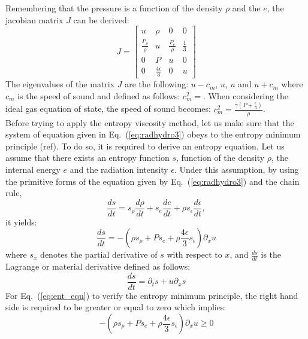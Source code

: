 \documentclass{article}
\newcommand{\eqt}[1]{Eq.~(\ref{#1})}                     %
\begin{document}
Remembering that the pressure is a function of the density $\rho$ and the $e$, the jacobian matrix $J$ can be derived:
\begin{equation}
J = \left[
\begin{array}{llll}
u & \rho & 0 & 0 \\
\frac{P_{\rho}}{\rho} & u & \frac{P_{e}}{\rho} & \frac{1}{3} \\
0 & P & u & 0 \\
0 & \frac{4 \epsilon}{3} & 0 & u  
\end{array}
\right]
\end{equation}
The eigenvalues of the matrix $J$ are the following: $u-c_m$, $u$, $u$ and $u+c_m$ where $c_m$ is the speed of sound and defined as follows: $c_m^2 = $. When considering the ideal gas equation of state, the speed of sound becomes: $c_m^2 = \frac{\gamma \left( P + \frac{\epsilon}{3} \right)}{\rho}$. \\
Before trying to apply the entropy viscosity method, let us make sure that the system of equation given in \eqt{eq:radhydro3} obeys to the entropy minimum principle (ref). To do so, it is required to derive an entropy equation. Let us assume that there exists an entropy function $s$, function of the density $\rho$, the internal energy $e$ and the radiation intensity $\epsilon$. Under this assumption, by using the primitive forms of the equation given by \eqt{eq:radhydro3} and the chain rule,
\begin{equation}
\label{eq:chain_rule}
\frac{ds}{dt} = s_{\rho} \frac{d \rho}{dt} + s_e \frac{d e}{dt} + \rho s_{\epsilon} \frac{d \epsilon}{dt},
\end{equation}
it yields:
\begin{equation}
\label{eq:ent_equ}
\frac{ds}{dt} = -\left( \rho s_{\rho} + P s_e + \rho \frac{4\epsilon}{3} s_{\epsilon} \right) \partial_x u
\end{equation}
where $s_x$ denotes the partial derivative of $s$ with respect to $x$, and $\frac{ds}{dt}$ is the Lagrange or material derivative defined as follows:
\begin{equation}
\frac{ds}{dt} = \partial_t s + u \partial_x s
\end{equation}
For \eqt{eq:ent_equ} to verify the entropy minimum principle, the right hand side is required to be greater or equal to zero which implies:
\begin{equation}
\label{eq:ent_equ2}
-\left( \rho s_{\rho} + P s_e + \rho \frac{4\epsilon}{3} s_{\epsilon} \right) \partial_x u \geq 0
\end{equation}
\end{document}
